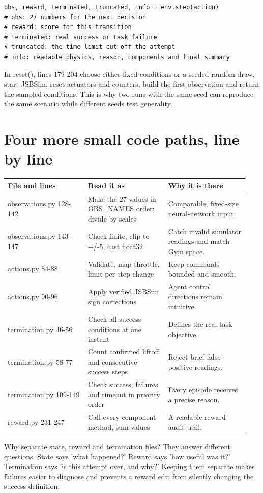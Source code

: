 \documentclass[11pt,a4paper]{article}
\begin{document}
\begin{Verbatim}[fontsize=\small]
obs, reward, terminated, truncated, info = env.step(action)
# obs: 27 numbers for the next decision
# reward: score for this transition
# terminated: real success or task failure
# truncated: the time limit cut off the attempt
# info: readable physics, reason, components and final summary
\end{Verbatim}
In reset(), lines 179-204 choose either fixed conditions or a seeded random draw, start JSBSim, reset actuators and counters, build the first observation and return the sampled conditions. This is why two runs with the same seed can reproduce the same scenario while different seeds test generality.

\section{Four more small code paths, line by line}
\begin{longtable}{|p{0.313\linewidth}|p{0.313\linewidth}|p{0.313\linewidth}|}\hline
File and lines & Read it as & Why it is there \\ \hline
observations.py 128-142 & Make the 27 values in OBS\_NAMES order; divide by scales & Comparable, fixed-size neural-network input. \\ \hline
observations.py 143-147 & Check finite, clip to +/-5, cast float32 & Catch invalid simulator readings and match Gym space. \\ \hline
actions.py 84-88 & Validate, map throttle, limit per-step change & Keep commands bounded and smooth. \\ \hline
actions.py 90-96 & Apply verified JSBSim sign corrections & Agent control directions remain intuitive. \\ \hline
termination.py 46-56 & Check all success conditions at one instant & Defines the real task objective. \\ \hline
termination.py 58-77 & Count confirmed liftoff and consecutive success steps & Reject brief false-positive readings. \\ \hline
termination.py 109-149 & Check success, failures and timeout in priority order & Every episode receives a precise reason. \\ \hline
reward.py 231-247 & Call every component method, sum values & A readable reward audit trail. \\ \hline
\end{longtable}
Why separate state, reward and termination files? They answer different questions. State says 'what happened?' Reward says 'how useful was it?' Termination says 'is this attempt over, and why?' Keeping them separate makes failures easier to diagnose and prevents a reward edit from silently changing the success definition.
\end{document}
